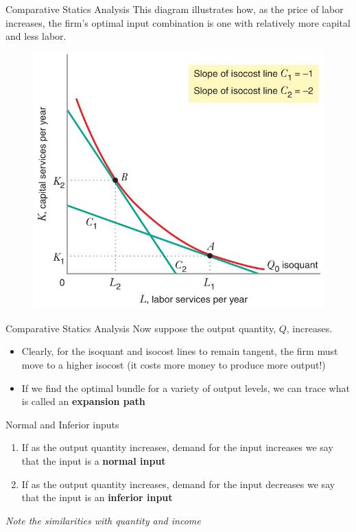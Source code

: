 \documentclass[11pt,t]{beamer}
\begin{document}
\begin{frame}{Comparative Statics Analysis}
  This diagram illustrates how, as the price of labor increases, the firm's optimal input combination is one with relatively more capital and less labor.

  \begin{figure}
    \includegraphics[width=0.5\linewidth]{figures/fig7_5.jpg}
  \end{figure}
\end{frame}

\begin{frame}{Comparative Statics Analysis}
  Now suppose the output quantity, $Q$, increases.

  \begin{itemize}
    \item Clearly, for the isoquant and isocost lines to remain tangent, the firm must move to a higher isocost (it costs more money to produce more output!)
    
    \item If we find the optimal bundle for a variety of output levels, we can trace what is called an \textbf{expansion path}
  \end{itemize}
\end{frame}

\begin{frame}{Normal and Inferior inputs}
  \begin{enumerate}
    \item If as the output quantity increases, demand for the input increases we say that the input is a \textbf{normal input}
    \item If as the output quantity increases, demand for the input decreases we say that the input is an \textbf{inferior input}
  \end{enumerate}

  \bigskip
  \emph{Note the similarities with quantity and income}
\end{frame}
\end{document}
